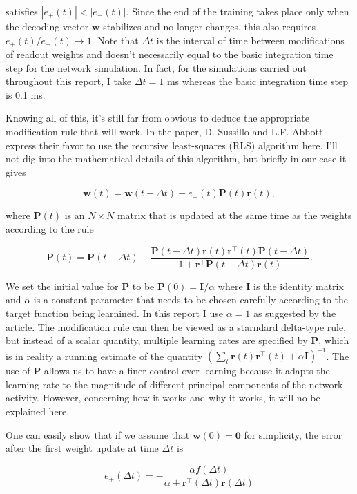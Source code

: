 \noindent
satisfies $|e_+(t)| < |e_-(t)|$. Since the end of the training takes place
only when the decoding vector $\mathbf{w}$ stabilizes and no longer changes,
this also requires $e_+(t)/e_-(t) \rightarrow 1$. 
Note that $\Delta t$ is the interval of time
between modifications of readout weights and doesn't necessarily equal to
the basic integration time step for the network simulation. In fact,
for the simulations carried out throughout this report, I take 
$\Delta t = 1$ ms whereas the basic integration time step is 0.1 ms.

Knowing all of this, it's still far from obvious to deduce the appropriate
modification rule that will work. In the paper, D. Sussillo and L.F. Abbott
express their favor to use the recursive least-squares (RLS) algorithm here.
I'll not dig into the mathematical details of this algorithm, but briefly
in our case it gives

\[\mathbf{w}(t) = \mathbf{w}(t-\Delta t)
                - e_-(t)\mathbf{P}(t)\mathbf{r}(t),\]

\noindent
where $\mathbf{P}(t)$ is an $N \times N$ matrix that is updated at the same
time as the weights according to the rule

\[\mathbf{P}(t) = \mathbf{P}(t-\Delta t) 
  - \frac{\mathbf{P}(t-\Delta t)\mathbf{r}(t)\mathbf{r}^{\top}(t)
    \mathbf{P}(t-\Delta t)}
    {1 + \mathbf{r}^{\top}\mathbf{P}(t-\Delta t)\mathbf{r}(t)}.\]

\noindent
We set the initial value for $\mathbf{P}$ to be 
$\mathbf{P}(0)=\mathbf{I}/\alpha$
where $\mathbf{I}$ is the identity matrix and $\alpha$ is a constant parameter
that needs to be chosen carefully
according to the target function being learnined. In this report I use
$\alpha = 1$ as suggested by the article. The modification rule can
then be viewed as a starndard delta-type rule, but instead of a scalar
quantity, multiple learning rates are specified by $\mathbf{P}$, which is
in reality a running estimate of the quantity 
$(\sum_t \mathbf{r}(t)\mathbf{r}^{\top}(t) + \alpha \mathbf{I})^{-1}$.
The use of $\mathbf{P}$ allows us to have a finer control over learning
because it adapts the learning rate to the magnitude of different principal
components of the network activity. However, concerning how it works and
why it works, it will no be explained here.

One can easily show that if we assume that $\mathbf{w}(0) = \mathbf{0}$
for simplicity, the error after the first weight update at time $\Delta t$
is

\[e_+(\Delta t) = - \frac{\alpha f(\Delta t)}
                {\alpha + \mathbf{r}^{\top}(\Delta t)\mathbf{r}(\Delta t)}\]

